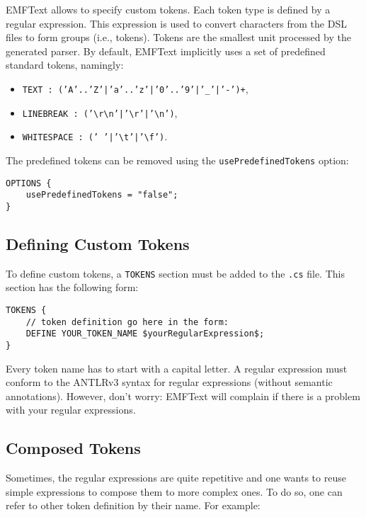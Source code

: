 EMFText allows to specify custom tokens. Each token type is defined by a regular
expression. This expression is used to convert characters from the DSL files
to form groups (i.e., tokens). Tokens are the smallest unit processed by the
generated parser. By default, EMFText implicitly uses a set of
predefined standard tokens, namingly:

\begin{itemize}
  \item \texttt{TEXT : ('A'..'Z'|'a'..'z'|'0'..'9'|'\_'|'-')+},
  \item \texttt{LINEBREAK :
  ('\textbackslash{}r\textbackslash{}n'|'\textbackslash{}r'|'\textbackslash{}n')},
  \item \texttt{WHITESPACE : (' '|'\textbackslash{}t'|'\textbackslash{}f')}.
\end{itemize}

The predefined tokens can be removed using the \texttt{usePredefinedTokens}
option:

\begin{lstlisting}
OPTIONS {
    usePredefinedTokens = "false";
}
\end{lstlisting}

\subsection{Defining Custom Tokens}

To define custom tokens, a \texttt{TOKENS} section must be added to the
\texttt{.cs} file. This section has the following form:

\begin{lstlisting}
TOKENS {
    // token definition go here in the form:
    DEFINE YOUR_TOKEN_NAME $yourRegularExpression$;
}
\end{lstlisting}

Every token name has to start with a capital letter. A regular expression must
conform to the ANTLRv3 syntax for regular expressions (without semantic
annotations). However, don't worry: EMFText will complain if there is a problem
with your regular expressions.

\subsection{Composed Tokens}

Sometimes, the regular expressions are quite repetitive and one wants to reuse 
simple expressions to compose them to more complex ones. To do so, one can refer 
to other token definition by their name. For example:

